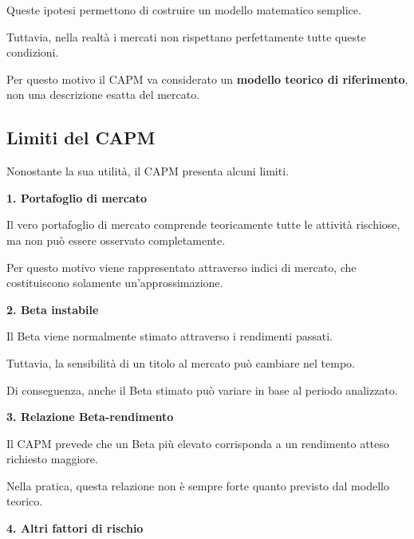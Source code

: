\noindent Queste ipotesi permettono
di costruire un modello matematico semplice.

\medskip

\noindent Tuttavia, nella realtà i mercati
non rispettano perfettamente tutte
queste condizioni.

\medskip

\noindent Per questo motivo il CAPM va considerato
un \textbf{modello teorico di riferimento},
non una descrizione esatta del mercato.


\subsection{Limiti del CAPM}

\noindent Nonostante la sua utilità,
il CAPM presenta alcuni limiti.

\medskip

\noindent \textbf{1. Portafoglio di mercato}

\noindent Il vero portafoglio di mercato
comprende teoricamente tutte le attività rischiose,
ma non può essere osservato completamente.

\medskip

\noindent Per questo motivo viene rappresentato
attraverso indici di mercato, che costituiscono
solamente un'approssimazione.

\medskip

\noindent \textbf{2. Beta instabile}

\noindent Il Beta viene normalmente stimato
attraverso i rendimenti passati.

\medskip

\noindent Tuttavia, la sensibilità di un titolo
al mercato può cambiare nel tempo.

\medskip

\noindent Di conseguenza, anche il Beta stimato
può variare in base al periodo analizzato.

\medskip

\noindent \textbf{3. Relazione Beta-rendimento}

\noindent Il CAPM prevede che un Beta più elevato
corrisponda a un rendimento atteso richiesto maggiore.

\medskip

\noindent Nella pratica, questa relazione
non è sempre forte quanto previsto
dal modello teorico.

\medskip

\noindent \textbf{4. Altri fattori di rischio}

